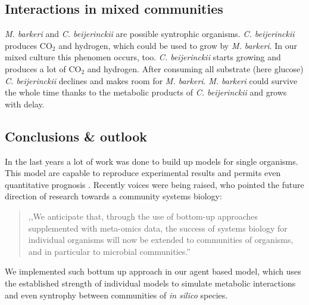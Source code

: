 \subsection{Interactions in mixed communities}
\textit{M. barkeri} and \textit{C. beijerinckii} are possible syntrophic organisms.
\textit{C. beijerinckii} produces CO$_2$ and hydrogen, which could be used to grow by \textit{M. barkeri}.
In our mixed culture this phenomen occurs, too.
\textit{C. beijerinckii} starts growing and produces a lot of CO$_2$ and hydrogen.
After consuming all substrate (here glucose) \textit{C. beijerinckii} declines and makes room for \textit{M. barkeri}.
\textit{M. barkeri} could survive the whole time thanks to the metabolic products of \textit{C. beijerinckii} and grows with delay.


\subsection{Conclusions \& outlook}
In the last years a lot of work was done to build up models for single organisms.
This model are capable to reproduce experimental results and permits even quantitative prognosis \cite{mccloskey}.
Recently voices were being raised, who pointed the future direction of research towards a community systems biology:
\begin{quote}
,,We anticipate that, through the use of bottom-up approaches supplemented with meta-omics data, the success of systems biology for individual organisms will now be extended to communities of organisms, and in particular to microbial communities.'' \cite{CoSy}
\end{quote}
We implemented such bottum up approach in our agent based model, which uses the established strength of individual models to simulate metabolic interactions and even syntrophy between communities of \textit{in silico} species.
